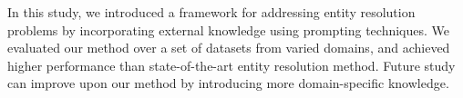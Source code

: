 
In this study, we introduced a framework for addressing entity resolution problems by incorporating external knowledge using prompting techniques. We evaluated our method over a set of datasets from varied domains, and achieved higher performance than state-of-the-art entity resolution method. 
Future study can improve upon our method by introducing more domain-specific knowledge. 
